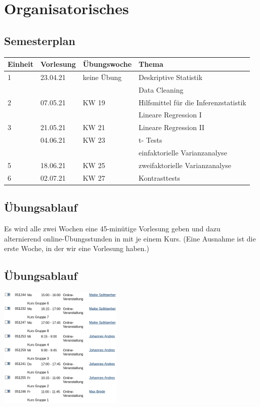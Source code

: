 \documentclass[
]{book}
\begin{document}
\hypertarget{organisatorisches}{%
\section{Organisatorisches}\label{organisatorisches}}

\hypertarget{semesterplan-1}{%
\subsection{Semesterplan}\label{semesterplan-1}}

\footnotesize \centering

\begin{tabular}[t]{llll}
\toprule
Einheit & Vorlesung & Übungswoche & Thema\\
\midrule
1 & 23.04.21 & keine Übung & Deskriptive Statistik\\
 &  &  & Data Cleaning\\
2 & 07.05.21 & KW 19 & Hilfsmittel für die Inferenzstatistik\\
 &  &  & Lineare Regression I\\
3 & 21.05.21 & KW 21 & Lineare Regression II\\
\addlinespace
4 & 04.06.21 & KW 23 & t- Tests\\
 &  &  & einfaktorielle Varianzanalyse\\
5 & 18.06.21 & KW 25 & zweifaktorielle Varianzanalyse\\
6 & 02.07.21 & KW 27 & Kontrasttests\\
\bottomrule
\end{tabular}

\hypertarget{uxfcbungsablauf}{%
\subsection{Übungsablauf}\label{uxfcbungsablauf}}

Es wird alle zwei Wochen eine 45-minütige Vorlesung geben und dazu alternierend online-Übungsstunden in mit je einem Kurs. (Eine Ausnahme ist die erste Woche, in der wir eine Vorlesung haben.)

\hypertarget{uxfcbungsablauf-1}{%
\subsection{Übungsablauf}\label{uxfcbungsablauf-1}}

\begin{center}\includegraphics[width=166.666666666667pt]{imgs/univis} \end{center}
\end{document}
